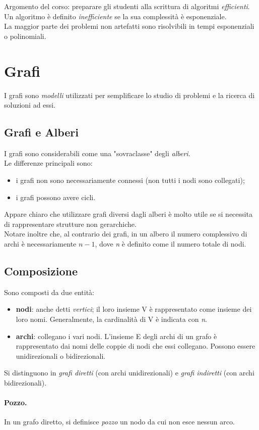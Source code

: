 Argomento del corso: preparare gli studenti alla scrittura di algoritmi \textit{efficienti}.
Un algoritmo è definito \textit{inefficiente} se la sua complessità è esponenziale.\\
La maggior parte dei problemi non artefatti sono risolvibili in tempi esponenziali o polinomiali.

\section{Grafi}
I grafi sono \textit{modelli} utilizzati per semplificare lo studio di problemi e la ricerca di soluzioni ad essi.
\subsection{Grafi e Alberi}
I grafi sono considerabili come una "sovraclasse" degli \textit{alberi}. \\
Le differenze principali sono:
\begin{itemize}
	\item i grafi non sono necessariamente connessi (non tutti i nodi sono collegati);
	\item i grafi possono avere cicli.
\end{itemize}
Appare chiaro che utilizzare grafi diversi dagli alberi è molto utile se si necessita di rappresentare strutture non gerarchiche. \\
Notare inoltre che, al contrario dei grafi, in un albero il numero complessivo di archi è necessariamente $n-1$, dove \textit{n} è definito come il numero totale di nodi.

\subsection{Composizione}
Sono composti da due entità:
\begin{itemize}
	\item \textbf{nodi}: anche detti \textit{vertici}; il loro insieme V è rappresentato come insieme dei loro nomi. Generalmente, la cardinalità di V è indicata con \textit{n}.
	\item \textbf{archi}: collegano i vari nodi. L'insieme E degli archi di un grafo è rappresentato dai nomi delle coppie di nodi che essi collegano. Possono essere unidirezionali o bidirezionali.
\end{itemize}
Si distinguono in \textit{grafi diretti} (con archi unidirezionali) e \textit{grafi indiretti} (con archi bidirezionali).
\paragraph{Pozzo.}
In un grafo diretto, si definisce \textit{pozzo} un nodo da cui non esce nessun arco.
